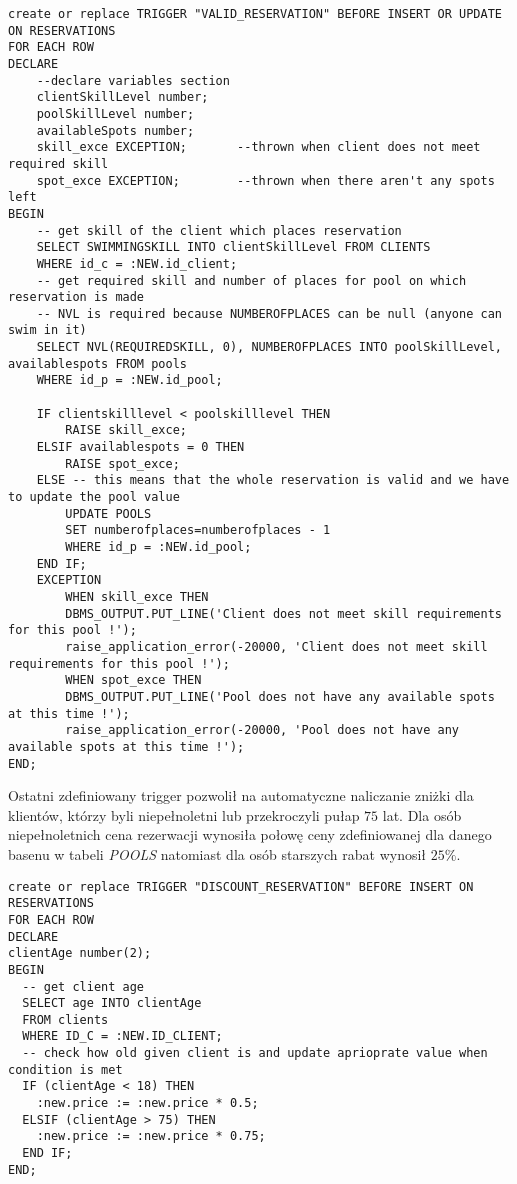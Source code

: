 \documentclass[a4paper]{article}
\begin{document}
\begin{verbatim}
create or replace TRIGGER "VALID_RESERVATION" BEFORE INSERT OR UPDATE ON RESERVATIONS
FOR EACH ROW
DECLARE
    --declare variables section
    clientSkillLevel number;
    poolSkillLevel number;
    availableSpots number;
    skill_exce EXCEPTION;       --thrown when client does not meet required skill
    spot_exce EXCEPTION;        --thrown when there aren't any spots left
BEGIN
    -- get skill of the client which places reservation
    SELECT SWIMMINGSKILL INTO clientSkillLevel FROM CLIENTS
    WHERE id_c = :NEW.id_client;
    -- get required skill and number of places for pool on which reservation is made
    -- NVL is required because NUMBEROFPLACES can be null (anyone can swim in it)
    SELECT NVL(REQUIREDSKILL, 0), NUMBEROFPLACES INTO poolSkillLevel, availablespots FROM pools
    WHERE id_p = :NEW.id_pool;
    
    IF clientskilllevel < poolskilllevel THEN
        RAISE skill_exce;
    ELSIF availablespots = 0 THEN
        RAISE spot_exce;
    ELSE -- this means that the whole reservation is valid and we have to update the pool value
        UPDATE POOLS
        SET numberofplaces=numberofplaces - 1
        WHERE id_p = :NEW.id_pool;
    END IF;
    EXCEPTION
        WHEN skill_exce THEN
        DBMS_OUTPUT.PUT_LINE('Client does not meet skill requirements for this pool !');
        raise_application_error(-20000, 'Client does not meet skill requirements for this pool !');
        WHEN spot_exce THEN
        DBMS_OUTPUT.PUT_LINE('Pool does not have any available spots at this time !');
        raise_application_error(-20000, 'Pool does not have any available spots at this time !');
END;
\end{verbatim}

\newpage

Ostatni zdefiniowany trigger pozwolił na automatyczne naliczanie zniżki dla klientów, którzy byli niepełnoletni lub przekroczyli pułap $75$ lat. Dla osób niepełnoletnich cena rezerwacji wynosiła połowę ceny zdefiniowanej dla danego basenu w tabeli \textit{POOLS} natomiast dla osób starszych rabat wynosił $25\%$.

\begin{verbatim}
create or replace TRIGGER "DISCOUNT_RESERVATION" BEFORE INSERT ON RESERVATIONS
FOR EACH ROW
DECLARE
clientAge number(2);
BEGIN
  -- get client age
  SELECT age INTO clientAge
  FROM clients
  WHERE ID_C = :NEW.ID_CLIENT;
  -- check how old given client is and update aprioprate value when condition is met
  IF (clientAge < 18) THEN
    :new.price := :new.price * 0.5;
  ELSIF (clientAge > 75) THEN
    :new.price := :new.price * 0.75;
  END IF;
END;
\end{verbatim}
\end{document}
